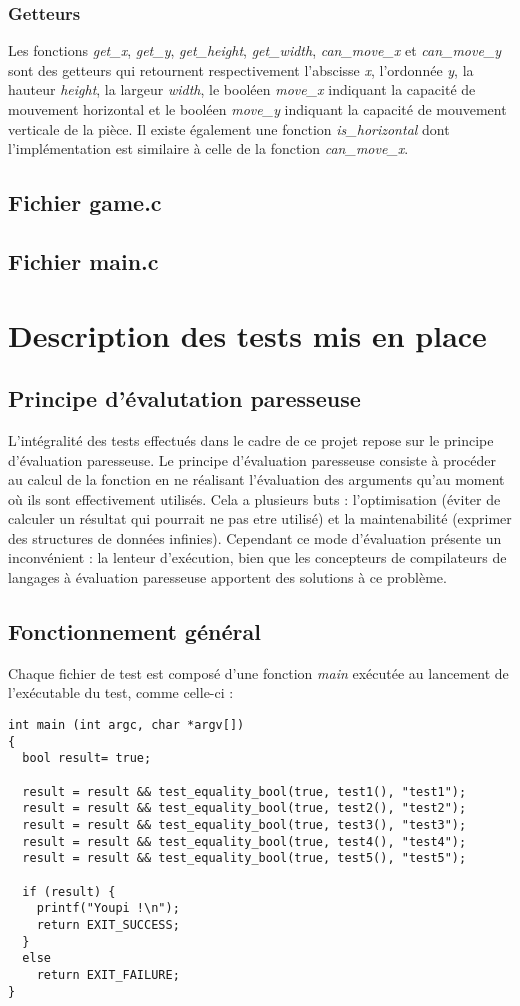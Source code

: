 \documentclass{report}
\begin{document}
\subsection{Getteurs}
Les fonctions \emph{get\_x}, \emph{get\_y}, \emph{get\_height}, \emph{get\_width}, \emph{can\_move\_x} et \emph{can\_move\_y} sont des getteurs qui retournent respectivement l'abscisse \emph{x}, l'ordonnée \emph{y}, la hauteur \emph{height}, la largeur \emph{width}, le booléen \emph{move\_x} indiquant la capacité de mouvement horizontal et le booléen \emph{move\_y} indiquant la capacité de mouvement verticale de la pièce. Il existe également une fonction \emph{is\_horizontal} dont l'implémentation est similaire à celle de la fonction \emph{can\_move\_x}.
\section{Fichier game.c}
\section{Fichier main.c}
\chapter{Description des tests mis en place}

\section{Principe d'évalutation paresseuse}
\label{Lexa}
L'intégralité des tests effectués dans le cadre de ce projet repose sur le principe d'évaluation paresseuse. Le principe d'évaluation paresseuse consiste à procéder au calcul de la fonction en ne réalisant l'évaluation des arguments qu'au moment où ils sont effectivement utilisés. Cela a plusieurs buts : l'optimisation (éviter de calculer un résultat qui pourrait ne pas etre utilisé) et la maintenabilité (exprimer des structures de données infinies). Cependant ce mode d'évaluation présente un inconvénient : la lenteur d'exécution, bien que les concepteurs de compilateurs de langages à évaluation paresseuse apportent des solutions à ce problème.

\section{Fonctionnement général}
\label{Clarke}
Chaque fichier de test est composé d'une fonction \emph{main} exécutée au lancement de l'exécutable du test, comme celle-ci :
\begin{lstlisting}
int main (int argc, char *argv[])
{
  bool result= true;

  result = result && test_equality_bool(true, test1(), "test1");
  result = result && test_equality_bool(true, test2(), "test2");
  result = result && test_equality_bool(true, test3(), "test3");
  result = result && test_equality_bool(true, test4(), "test4");
  result = result && test_equality_bool(true, test5(), "test5");

  if (result) {
    printf("Youpi !\n");
    return EXIT_SUCCESS;
  }
  else
    return EXIT_FAILURE;
}
\end{lstlisting}
\end{document}
